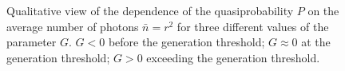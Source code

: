 \begin{figure}
\centering



\caption{Qualitative view of the dependence of the quasiprobability $P$ on the average number of photons $\bar{n} = r^2$ for three different values of the parameter $G$. $G < 0$ before the generation threshold; $G \approx 0$ at the generation threshold; $G > 0$ exceeding the generation threshold.}
\label{figPart2Ch1_6}
\end{figure}